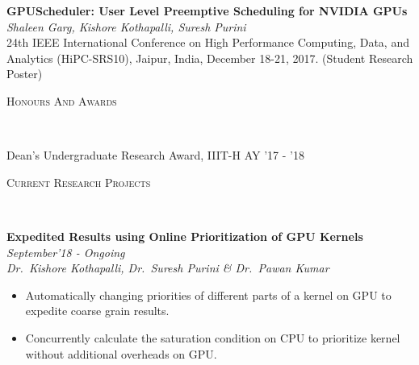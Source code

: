 \documentclass[10pt]{article}
\newenvironment{changemargin}[2]{%
    \begin{list}{}{%
            \setlength{\topsep}{0pt}%
            \setlength{\leftmargin}{#1}%
            \setlength{\rightmargin}{#2}%
            \setlength{\listparindent}{\parindent}%
        \setlength{\itemindent}{\parindent}%
            \setlength{\parsep}{\parskip}%
        }%
\item[]}{\end{list}
}
\newcommand{\lineover}{
    \begin{changemargin}{-0.05in}{-0.10in}
        \vspace*{-8pt}
        \hrulefill \\
        \vspace*{-2pt}
    \end{changemargin}
}
\newcommand{\header}[1]{
    \begin{changemargin}{-0.75in}{-0.75in}
        \scshape{#1}\\
        \lineover
    \end{changemargin}
}
\newenvironment{body} {
    \vspace*{-16pt}
    \begin{changemargin}{-0.6in}{-0.65in}
    }   
    {\end{changemargin}
}
\begin{document}
\begin{body}
    \vspace{14pt}
    \textbf{GPUScheduler: User Level Preemptive Scheduling for NVIDIA GPUs}\\
    \emph{Shaleen Garg, Kishore Kothapalli, Suresh Purini}\\
    24th IEEE International Conference on High Performance Computing, Data, and Analytics (HiPC-SRS10), Jaipur, India, December 18-21, 2017. (Student Research Poster)
\end{body}

\smallskip
\header{Honours And Awards}
\vspace{14pt}
\begin{body}
    Dean's Undergraduate Research Award, IIIT-H  \hfill {AY '17 - '18}
\end{body}
\vspace{14pt}

\smallskip
\header{Current Research Projects}

 \begin{body}
     \vspace{14pt}
     \textbf{Expedited Results using Online Prioritization of GPU Kernels} \hfill \emph{September'18 - Ongoing}\\
     \emph{Dr.~Kishore Kothapalli, Dr.~Suresh Purini \& Dr.~Pawan Kumar}
     \begin{itemize}
         \item{Automatically changing priorities of different parts of a kernel on GPU to expedite coarse grain results.}
         \item{Concurrently calculate the saturation condition on CPU to prioritize kernel without additional overheads on GPU.}
     \end{itemize}
     \smallskip 
 \end{body}
\end{document}
